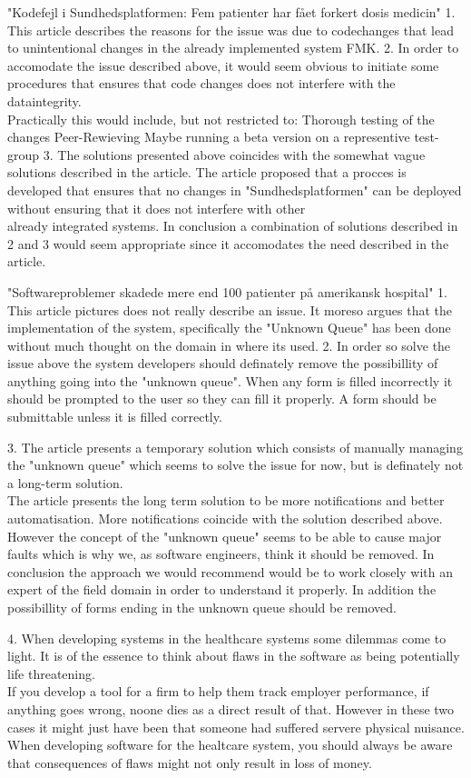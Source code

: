 

"Kodefejl i Sundhedsplatformen: Fem patienter har fået forkert dosis medicin"
1.
This article describes the reasons for the issue was due to codechanges
that lead to unintentional changes in the already implemented system FMK.
2. 
In order to accomodate the issue described above, it would seem obvious to initiate some procedures that ensures that code changes does not interfere with the dataintegrity.\\
Practically this would include, but not restricted to:
Thorough testing of the changes
Peer-Rewieving
Maybe running a beta version on a representive test-group
3.
The solutions presented above coincides with the somewhat vague solutions described in the article.
The article proposed that a procces is developed that ensures that no changes in "Sundhedsplatformen" can be deployed without ensuring that it does not interfere with other\\
already integrated systems.
In conclusion a combination of solutions described in 2 and 3 would seem appropriate since it accomodates the need described in the article.


"Softwareproblemer skadede mere end 100 patienter på amerikansk hospital"
1.
This article pictures does not really describe an issue.
It moreso argues that the implementation of the system, specifically the "Unknown Queue" has been done without much thought on the domain in where its used.
2.
In order so solve the issue above the system developers should definately remove the possibillity of anything going into the "unknown queue".
When any form is filled incorrectly it should be prompted to the user so they can fill it properly. A form should be submittable unless it is filled correctly.


3.
The article presents a temporary solution which consists of manually managing the "unknown queue" which seems to solve the issue for now, but is definately not a long-term solution.\\
The article presents the long term solution to be more notifications and better automatisation. More notifications coincide with the solution described above.\\
However the concept of the "unknown queue" seems to be able to cause major faults which is why we, as software engineers, think it should be removed.
In conclusion the approach we would recommend would be to work closely with an expert of the field domain in order to understand it properly.
In addition the possibillity of forms ending in the unknown queue should be removed.


4.
When developing systems in the healthcare systems some dilemmas come to light. It is of the essence to think about flaws in the software as being potentially life threatening.\\
If you develop a tool for a firm to help them track employer performance, if anything goes wrong, noone dies as a direct result of that.
However in these two cases it might just have been that someone had suffered servere physical nuisance.\\
When developing software for the healtcare system, you should always be aware that consequences of flaws might not only result in loss of money.
